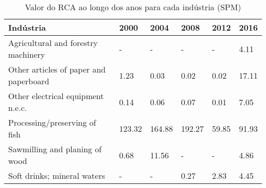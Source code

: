 \begin{table}
\centering
\caption{Valor do RCA ao longo dos anos para cada indústria (SPM)}
\begin{tabular}{p{6cm}p{1.5cm}p{1.5cm}p{1.5cm}p{1.5cm}p{1.5cm}}
\toprule
                             Indústria &   2000 &   2004 &   2008 &  2012 &  2016 \\
\midrule
   Agricultural and forestry machinery &      - &      - &      - &     - &  4.11 \\
Other articles of paper and paperboard &   1.23 &   0.03 &   0.02 &  0.02 & 17.11 \\
     Other electrical equipment n.e.c. &   0.14 &   0.06 &   0.07 &  0.01 &  7.05 \\
         Processing/preserving of fish & 123.32 & 164.88 & 192.27 & 59.85 & 91.93 \\
        Sawmilling and planing of wood &   0.68 &  11.56 &      - &     - &  4.86 \\
           Soft drinks; mineral waters &      - &      - &   0.27 &  2.83 &  4.45 \\
\bottomrule
\end{tabular}
\end{table}
